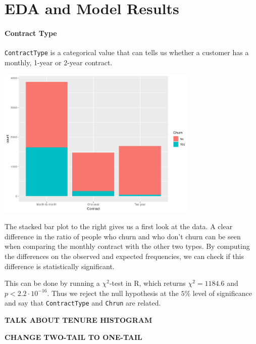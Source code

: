 \documentclass[man, floatsintext]{apa6}
\begin{document}
\section{EDA and Model Results} 

\paragraph{Contract Type}
\texttt{ContractType} is a categorical value that can tells us whether a customer has a monthly, 1-year or 2-year contract. 

\hspace{0.5mm}

\noindent\begin{minipage}{0.54\textwidth}
\includegraphics[width = \linewidth, height = 72mm]{CountvsContractTypebyChurn}
\end{minipage}
\hfill
\begin{minipage}{0.42\textwidth} The stacked bar plot to the right gives us a first look at the data. A clear difference in the ratio of people who churn and who don't churn can be seen when comparing the monthly contract with the other two types. By computing the differences on the observed and expected frequencies, we can check if this difference is statistically significant. 
\end{minipage}  

\hspace{0.5mm}

This can be done by running a $\chi^2$-test in R, which returns $\chi^2 = 1184.6$ and $p < 2.2 \cdot 10^{-16}$. Thus we reject the null hypothesis at the $5 \%$ level of significance and say that \texttt{ContractType} and \texttt{Chrun} are related.  

\textbf{TALK ABOUT TENURE HISTOGRAM}

\textbf{CHANGE TWO-TAIL TO ONE-TAIL}
\end{document}

